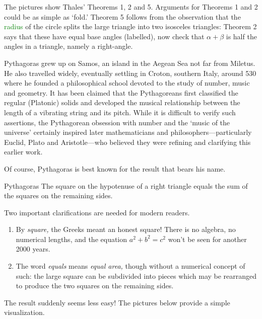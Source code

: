 The pictures show Thales' Theorems 1, 2 and 5. Arguments for Theorems 1 and 2 could be as simple as `fold.' Theorem 5 follows from the observation that the \textcolor{Green}{radius} of the circle splits the large triangle into two isosceles triangles: Theorem 2 says that these have equal base angles (labelled), now check that $\alpha+\beta$ is half the angles in a triangle, namely a right-angle.



Pythagoras grew up on Samos, an island in the Aegean Sea not far from Miletus. He also travelled widely, eventually settling in Croton, southern Italy, around 530\,\BC{} where he founded a philosophical school devoted to the study of number, music and geometry. It has been claimed that the Pythagoreans first classified the regular (Platonic) solids and developed the musical relationship between the length of a vibrating string and its pitch. While it is difficult to verify such assertions, the Pythagorean obsession with number and the `music of the universe' certainly inspired later mathematicians and philosophers---particularly Euclid, Plato and Aristotle---who believed they were refining and clarifying this earlier work.
\smallbreak

Of course, Pythagoras is best known for the result that bears his name.

\begin{thm}{Pythagoras}{}
	The square on the hypotenuse of a right triangle equals the sum of the squares on the remaining sides.
\end{thm}

Two important clarifications are needed for modern readers.
\begin{enumerate}\itemsep0pt
  \item By \emph{square,} the Greeks meant an honest square! There is no algebra, no numerical lengths, and the equation $a^2+b^2=c^2$ won't be seen for another 2000 years.
  \item The word \emph{equals} means \emph{equal area,} though without a numerical concept of such: the large square can be subdivided into pieces which may be rearranged to produce the two squares on the remaining sides.
\end{enumerate}

\goodbreak

The result suddenly seems less easy! The pictures below provide a simple visualization.

